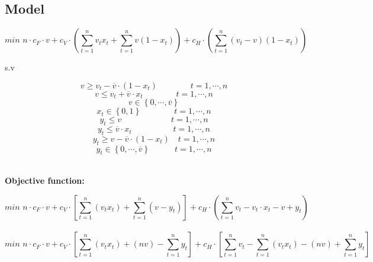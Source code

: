 \documentclass[a4paper,12pt,titlepage]{article}
\begin{document}
\subsection*{Model}
\begin{equation}
min\,\, n\cdot c_F\cdot v + c_V\cdot\left( \sum_{t=1}^{n}v_tx_t + \sum_{t=1}^{n}v(1-x_t)\right)  + c_H\cdot\left( \sum_{t=1}^{n}(v_t - v)(1-x_t)\right) 
\tag{1}
\end{equation}
\begin{center}
	s.v
\end{center}
\begin{equation}
v\geq v_t-\overline{v}\cdot(1-x_t)\qquad\qquad t=1,\cdots,n
\tag{2}
\end{equation}
\begin{equation}
v\leq v_t+\overline{v}\cdot x_t\qquad\qquad t=1,\cdots,n
\tag{3}
\end{equation}
\begin{equation}
v \in\left\lbrace  0,\cdots,\overline{v}\right\rbrace
\tag{4}
\end{equation}
\begin{equation}
x_t \in \left\lbrace 0,1\right\rbrace \qquad\qquad t=1,\cdots,n
\tag{5}
\end{equation}
\begin{equation}
y_t \leq v\qquad\qquad\qquad t=1,\cdots,n
\tag{6}
\end{equation}
\begin{equation}
y_t \leq\overline{v}\cdot x_t\qquad\qquad\quad  t=1,\cdots,n
\tag{7}
\end{equation}
\begin{equation}
y_t \geq v- \overline{v}\cdot(1- x_t)\quad t=1,\cdots,n
\tag{8}
\end{equation}
\begin{equation}
y_t \in \left\lbrace 0,\cdots,\overline{v}\right\rbrace \quad\qquad t=1,\cdots,n
\tag{9}
\end{equation}
\\
\begin{center}
\textbf{Objective function:}	
\end{center}
 
\begin{equation}
min\,\, n\cdot c_F\cdot v + c_V\cdot\left[ \sum_{t=1}^{n}(v_tx_t) + \sum_{t=1}^{n}(v- y_t)\right]  + c_H\cdot\left( \sum_{t=1}^{n}v_t - v_t\cdot x_t -v + y_t\right)
\tag{10}
\end{equation}
\\
\begin{equation}
min\,\, n\cdot c_F\cdot v + c_V\cdot\left[ \sum_{t=1}^{n}(v_tx_t) + (nv) - \sum^n_{t = 1}y_t\right]  + c_H\cdot\left[ \sum^n_{t = 1}v_t - \sum^n_{t = 1}(v_tx_t) - (nv) + \sum^n_{t = 1}y_t\right]
\tag{11}
\end{equation}
	
\end{document}
